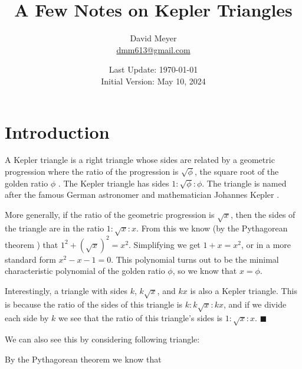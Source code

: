 \documentclass{article}
\title{A Few Notes on Kepler Triangles}
\author{David Meyer \\ \href{mailto:dmm613@gmail.com}
                            {dmm613@gmail.com}}
\date{Last Update: \today \\
	 {\vspace{1.00mm} \small Initial Version: May 10, 2024}}
\theoremstyle{definition}
\begin{document}
\maketitle
%
%
%
\section{Introduction}
\label{section:introduction}
A Kepler triangle is a right triangle whose sides are related by
a geometric progression
\cite{wiki:geometric_series,wikipedia:kepler_triangle} where the
ratio of the progression is $\sqrt{\phi}$, the square root of the
golden ratio $\phi$ \cite{wiki:golden_ratio}. The Kepler triangle
has sides $1:\sqrt{\phi}:\phi$. The triangle is named after the
famous German astronomer and mathematician Johannes Kepler
\cite{wikipedia:johannes_kepler}.

\bigskip
\noindent
More generally, if the ratio of the geometric progression is
$\sqrt{x}$, then the sides of the triangle are in the ratio $1 :
\sqrt{x} : x$. From this we know (by the Pythagorean theorem
\cite{wiki:trig}) that $1^{2} +(\sqrt{x})^{2} =
x^{2}$. Simplifying we get $1 +x = x^{2}$, or in a more standard
form $x^{2}-x-1 = 0$.  This polynomial turns out to be the
minimal characteristic polynomial of the golden ratio $\phi$, so
we know that $x = \phi$.

\bigskip
\noindent
Interestingly, a triangle with sides $k$, $k\sqrt{x}$, and $kx$
is also a Kepler triangle. This is because the ratio of the sides
of this triangle is $k:k\sqrt{x}:kx$, and if we divide each side
by $k$ we see that the ratio of this triangle's sides is
$1:\sqrt{x}:x$. $\blacksquare$

\bigskip
\noindent
We can also see this by considering following triangle:

\bigskip
%
%
\begin{figure}[H]                                                               %
  \centering                                                                    %
  \resizebox{0.25 \textwidth}{!} {                                              %
  }                                                                             %
\end{figure}                                                                    %
%
%
%
\noindent 
By the Pythagorean theorem we know that
\end{document}

